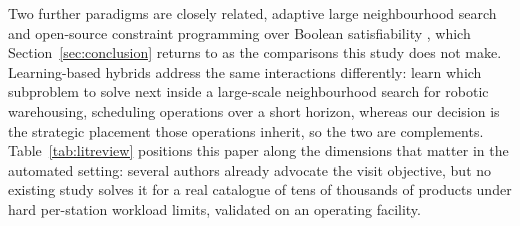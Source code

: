 \documentclass[]{interact}
\begin{document}
Two further paradigms are closely related, adaptive large neighbourhood search \citep{ropke2006alns} and open-source constraint programming over Boolean satisfiability \citep{perron2023cpsat}, which Section~\ref{sec:conclusion} returns to as the comparisons this study does not make. Learning-based hybrids address the same interactions differently: \citet{barnhart2024learnthenoptimize} learn which subproblem to solve next inside a large-scale neighbourhood search for robotic warehousing, scheduling operations over a short horizon, whereas our decision is the strategic placement those operations inherit, so the two are complements. Table~\ref{tab:litreview} positions this paper along the dimensions that matter in the automated setting: several authors already advocate the visit objective, but no existing study solves it for a real catalogue of tens of thousands of products under hard per-station workload limits, validated on an operating facility.
\end{document}
